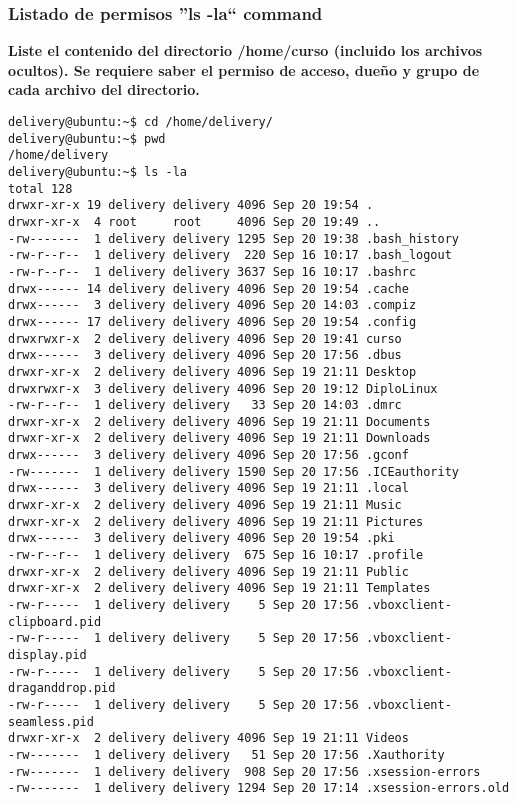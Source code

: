 \documentclass[a4paper,11pt,spanish]{article} %
\newenvironment{myscriptlisting}
{\begin{list}{}{\setlength{\leftmargin}{1em}}\item\scriptsize\bfseries}
{\end{list}}
\begin{document}
\subsubsection{Listado de permisos ''ls -la`` command}
\textbf{Liste el contenido del directorio /home/curso (incluido los archivos ocultos). 
Se requiere saber el permiso de acceso, dueño y grupo de cada archivo del directorio.}

\begin{myscriptlisting}
  \begin{verbatim}
delivery@ubuntu:~$ cd /home/delivery/
delivery@ubuntu:~$ pwd
/home/delivery
delivery@ubuntu:~$ ls -la
total 128
drwxr-xr-x 19 delivery delivery 4096 Sep 20 19:54 .
drwxr-xr-x  4 root     root     4096 Sep 20 19:49 ..
-rw-------  1 delivery delivery 1295 Sep 20 19:38 .bash_history
-rw-r--r--  1 delivery delivery  220 Sep 16 10:17 .bash_logout
-rw-r--r--  1 delivery delivery 3637 Sep 16 10:17 .bashrc
drwx------ 14 delivery delivery 4096 Sep 20 19:54 .cache
drwx------  3 delivery delivery 4096 Sep 20 14:03 .compiz
drwx------ 17 delivery delivery 4096 Sep 20 19:54 .config
drwxrwxr-x  2 delivery delivery 4096 Sep 20 19:41 curso
drwx------  3 delivery delivery 4096 Sep 20 17:56 .dbus
drwxr-xr-x  2 delivery delivery 4096 Sep 19 21:11 Desktop
drwxrwxr-x  3 delivery delivery 4096 Sep 20 19:12 DiploLinux
-rw-r--r--  1 delivery delivery   33 Sep 20 14:03 .dmrc
drwxr-xr-x  2 delivery delivery 4096 Sep 19 21:11 Documents
drwxr-xr-x  2 delivery delivery 4096 Sep 19 21:11 Downloads
drwx------  3 delivery delivery 4096 Sep 20 17:56 .gconf
-rw-------  1 delivery delivery 1590 Sep 20 17:56 .ICEauthority
drwx------  3 delivery delivery 4096 Sep 19 21:11 .local
drwxr-xr-x  2 delivery delivery 4096 Sep 19 21:11 Music
drwxr-xr-x  2 delivery delivery 4096 Sep 19 21:11 Pictures
drwx------  3 delivery delivery 4096 Sep 20 19:54 .pki
-rw-r--r--  1 delivery delivery  675 Sep 16 10:17 .profile
drwxr-xr-x  2 delivery delivery 4096 Sep 19 21:11 Public
drwxr-xr-x  2 delivery delivery 4096 Sep 19 21:11 Templates
-rw-r-----  1 delivery delivery    5 Sep 20 17:56 .vboxclient-clipboard.pid
-rw-r-----  1 delivery delivery    5 Sep 20 17:56 .vboxclient-display.pid
-rw-r-----  1 delivery delivery    5 Sep 20 17:56 .vboxclient-draganddrop.pid
-rw-r-----  1 delivery delivery    5 Sep 20 17:56 .vboxclient-seamless.pid
drwxr-xr-x  2 delivery delivery 4096 Sep 19 21:11 Videos
-rw-------  1 delivery delivery   51 Sep 20 17:56 .Xauthority
-rw-------  1 delivery delivery  908 Sep 20 17:56 .xsession-errors
-rw-------  1 delivery delivery 1294 Sep 20 17:14 .xsession-errors.old
  \end{verbatim}
\end{myscriptlisting}
\end{document}
